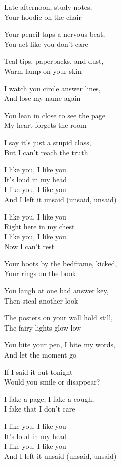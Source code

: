 \begin{lyrics}
Late afternoon, study notes,\\
Your hoodie on the chair

Your pencil taps a nervous beat,\\
You act like you don't care

Teal tips, paperbacks, and dust,\\
Warm lamp on your skin

I watch you circle answer lines,\\
And lose my name again

You lean in close to see the page\\
My heart forgets the room

I say it's just a stupid class,\\
But I can't reach the truth

I like you, I like you\\
It's loud in my head\\
I like you, I like you\\
And I left it unsaid
(unsaid, unsaid)

I like you, I like you\\
Right here in my chest\\
I like you, I like you\\
Now I can't rest

Your boots by the bedframe, kicked,\\
Your rings on the book

You laugh at one bad answer key,\\
Then steal another look

The posters on your wall hold still,\\
The fairy lights glow low

You bite your pen, I bite my words,\\
And let the moment go

If I said it out tonight\\
Would you smile or disappear?

I fake a page, I fake a cough,\\
I fake that I don't care

I like you, I like you\\
It's loud in my head\\
I like you, I like you\\
And I left it unsaid
(unsaid, unsaid)


\end{lyrics}
